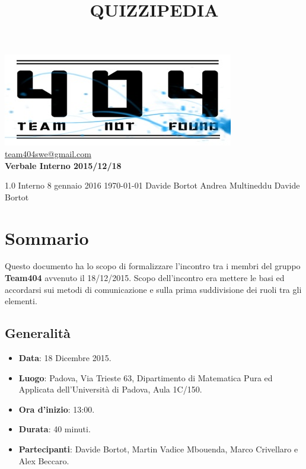\documentclass[a4paper,11pt]{article}
\title{\textbf{{\fontsize{10mm}{6mm}\selectfont QUIZZIPEDIA}}}
\begin{document}
	\maketitle
	
	\begin{center}

	\includegraphics{../../../team_not_found.jpg}\\	
	\fontsize{5mm}{3mm}\url{team404swe@gmail.com}\\
	\vspace{40mm}
	\textbf{ Verbale Interno 2015/12/18 }
	\end{center}
	\thispagestyle{empty}	%
			{1.0} 							%
			{Interno} 						%
			{8 gennaio 2016} 				%
			{\today} 						%
			{Davide Bortot}					%
			{Andrea Multineddu} 			%
			{Davide Bortot} 				%
	
	\newpage
	\section{Sommario}
	Questo documento ha lo scopo di formalizzare l'incontro tra i membri del gruppo \textbf{Team404} avvenuto il 18/12/2015. Scopo dell'incontro era mettere le basi ed accordarsi sui metodi di comunicazione e sulla prima suddivisione dei ruoli tra gli elementi.
	\subsection{Generalità}
	\begin{itemize}
	\item\textbf{Data}: 18 Dicembre 2015.
	\item\textbf{Luogo}: Padova, Via Trieste 63, Dipartimento di Matematica Pura ed Applicata dell'Università di Padova, Aula 1C/150.
	\item\textbf{Ora d'inizio}: 13:00.
	\item\textbf{Durata}: 40 minuti.
	\item\textbf{Partecipanti}: Davide Bortot, Martin Vadice Mbouenda, Marco Crivellaro e Alex Beccaro.
	\end{itemize}
\end{document}
